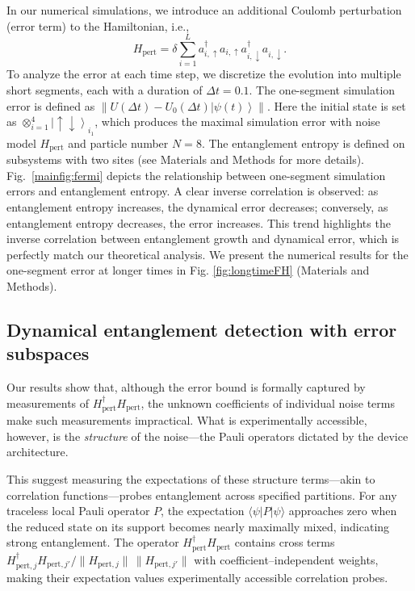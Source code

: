 \documentclass[12pt]{article}
\newcommand{\ket}[1]{\left|#1\right\rangle}
\newcommand{\norm}[1]{\left\lVert #1\right\rVert}
\begin{document}
In our numerical simulations, we introduce an additional Coulomb perturbation (error term) to the Hamiltonian, i.e.,
\begin{equation}
H_{\text{pert}}=\delta\sum_{i=1}^La_{i,\uparrow}^\dagger a_{i,\uparrow}a_{i,\downarrow}^\dagger a_{i,\downarrow}.
\label{FH}
\end{equation}
To analyze the error at each time step, we discretize the evolution into multiple short segments, each with a duration of $\Delta t=0.1$. The one-segment simulation error is defined as $\norm{U(\Delta t)-U_0(\Delta t)\ket{\psi(t)}}$. Here the initial state is set as $\otimes_{i=1}^4\ket{\uparrow\downarrow}_{i_1}$, which produces the maximal simulation error with noise model $H_{\text{pert}}$ and particle number $N=8$. 
The entanglement entropy is defined on subsystems with two sites (see Materials and Methods for more details). 
Fig.~\ref{mainfig:fermi} depicts the relationship between one-segment simulation errors and entanglement entropy. A clear inverse correlation is observed: as entanglement entropy increases, the dynamical error decreases; conversely, as entanglement entropy decreases, the error increases. This trend highlights the inverse correlation between entanglement growth and dynamical error, which is perfectly match our  theoretical analysis. We present the numerical results for the one-segment error at longer times in Fig. \ref{fig:longtimeFH} (Materials and Methods).











\subsection*{Dynamical entanglement detection with error subspaces}

Our results show that, although the error bound is formally captured by measurements of $H_{\text{pert}}^\dagger H_{\text{pert}}$, the unknown coefficients of individual noise terms make such measurements impractical. What is experimentally accessible, however, is the \emph{structure} of the noise---the Pauli operators dictated by the device architecture.

This suggest measuring the expectations of these structure terms---akin to correlation functions---probes entanglement across specified partitions. For any traceless local Pauli operator $P$, the expectation $\langle\psi|P|\psi\rangle$ approaches zero when the reduced state on its support becomes nearly maximally mixed, indicating strong entanglement. The operator $H_{\text{pert}}^\dagger H_{\text{pert}}$ contains cross terms
${H_{\text{pert},j}^\dagger H_{\text{pert},j'}}/{\|H_{\text{pert},j}\|\,\|H_{\text{pert},j'}\|}$
with coefficient--independent weights, making their expectation values experimentally accessible correlation probes.
\end{document}
